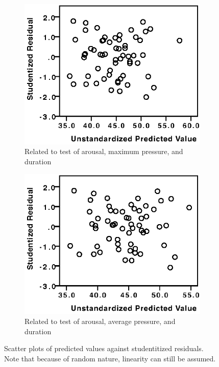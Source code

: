\begin{figure}[h]
\begin{subfigure}[b]{0.45\textwidth}
    \label{fig:valence_avg}
\end{subfigure}
\par\bigskip
\par\bigskip
\begin{subfigure}[b]{0.45\textwidth}
    \centering
    \includegraphics[width=\textwidth]{images/linearity/ArMax.eps}
    \caption{Related to test of arousal, maximum pressure, and duration}
    \label{fig:arousal_maximum}
\end{subfigure}
\quad
\begin{subfigure}[b]{0.45\textwidth}
    \centering
    \includegraphics[width=\textwidth]{images/linearity/ArAvg.eps}
    \caption{Related to test of arousal, average pressure, and duration}
    \label{fig:arousal_avg}
\end{subfigure}
\caption{Scatter plots of predicted values against studentitized residuals. Note that because of random nature, linearity can still be assumed.}
\end{figure}